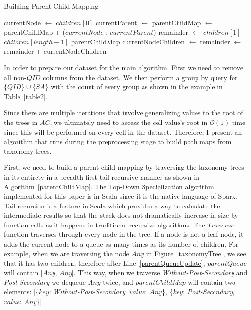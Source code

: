\documentclass[11pt]{article}       %
\begin{document}
\begin{algorithm}[h]
\label{parentChildMap}
\caption{Building Parent Child Mapping}
\BlankLine
{} {
  \BlankLine
  currentNode $\leftarrow$ $children[0]$\;
  currentParent $\leftarrow$ \;
  parentChildMap $\leftarrow$ parentChildMap + ($currentNode$ : $currentParent$)\;
  remainder $\leftarrow$ $children[1]$ \KwTo $children[length - 1]$\;
  \BlankLine  
   {
    \KwRet parentChildMap\;
  }
  \BlankLine
   {
    \KwRet {}\;
  } {
    currentNodeChildren $\leftarrow$ \;
     
    remainder $\leftarrow$ remainder + currentNodeChildren\;
    \KwRet {}\;
  }

}
\end{algorithm}

In order to prepare our dataset for the main algorithm. First we need to remove all non-$QID$ columns from the dataset. We then perform a group by query for \( \{QID\} \cup \{SA\} \) with the count of every group as shown in the example in Table~\ref{table2}.

Since there are multiple iterations that involve generalizing values to the root of the trees in $AC$, we ultimately need to access the cell value's root in \(\mathcal{O}(1)\) time since this will be performed on every cell in the dataset. Therefore, I present an algorithm that runs during the preprocessing stage to build path maps from taxonomy trees.

First, we need to build a parent-child mapping by traversing the taxonomy trees in its entirety in a breadth-first tail-recursive manner as shown in Algorithm~\ref{parentChildMap}. The Top-Down Specialization algorithm implemented for this paper is in Scala since it is the native language of Spark. Tail recursion is a feature in Scala which provides a way to calculate the intermediate results so that the stack does not dramatically increase in size by function calls as it happens in traditional recursive algorithms. The $Traverse$ function traverses through every node in the tree. If a node is not a leaf node, it adds the current node to a queue as many times as its number of children. For example, when we are traversing the node $Any$ in Figure~\ref{taxonomyTree}, we see that it has two children, therefore after Line~\ref{parentQueueUpdate}, $parentQueue$ will contain [$Any$, $Any$]. This way, when we traverse \emph{Without-Post-Secondary} and \emph{Post-Secondary} we dequeue $Any$ twice, and $parentChildMap$ will contain two elements: [\{$key$: \emph{Without-Post-Secondary}, $value$: $Any$\}, \{$key$: \emph{Post-Secondary}, $value$: $Any$\}]
\end{document}
